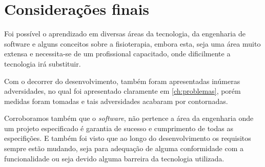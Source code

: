 \chapter[Considerações finais]{Considerações finais}\label{ch:consideracoes}
Foi possível o aprendizado em diversas áreas da tecnologia, da engenharia de software e alguns conceitos sobre a fisioterapia,
embora esta, seja uma área muito extensa e necessita-se de um profissional capacitado, onde dificilmente a tecnologia irá substituir.

Com o decorrer do desenvolvimento, também foram apresentadas inúmeras adversidades, no qual foi apresentado claramente em \ref{ch:problemas},
porém medidas foram tomadas e tais adversidades acabaram por contornadas.

Corroboramos também que o \textit{software}, não pertence a área da engenharia onde um projeto especificado  é garantia de sucesso e cumprimento de todas as especifições. E também foi visto que ao longo do desenvolvimento
os requisitos sempre estão mudando, seja para adequação de alguma conformidade com a funcionalidade ou seja devido alguma barreira da tecnologia utilizada.
